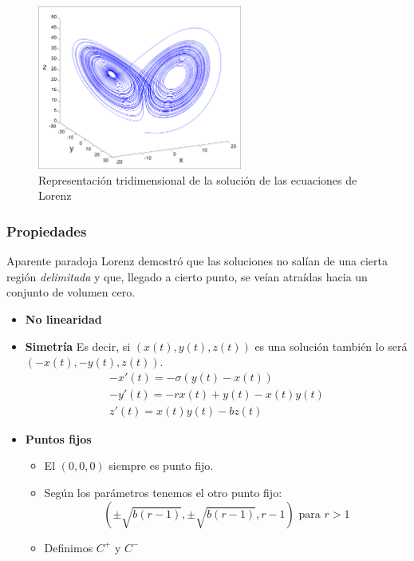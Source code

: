 \documentclass[8pt]{beamer}
\begin{document}
\begin{frame}
\begin{figure}[hbtp]
\centering
\includegraphics[width = 0.6\textwidth]{img/Lorenz.png}
\caption{Representación tridimensional de la solución de las ecuaciones de Lorenz}
\label{fig:Lorenz}
\end{figure}
\end{frame}

\subsubsection{Propiedades}
\begin{frame}
\begin{block}{Aparente paradoja}
Lorenz demostró que las soluciones no salían de una cierta región \emph{delimitada} y que, llegado a cierto punto, se veían atraídas hacia un conjunto de volumen cero.
\end{block}

\begin{itemize}
\item \textbf{No linearidad}
\item \textbf{Simetría}
Es decir, si $(x(t),y(t),z(t))$ es una solución también lo será $(-x(t),-y(t),z(t))$.
\[\begin{array}{l}
-x'(t) = -σ(y(t)-x(t)) \\
-y'(t) = -rx(t)+y(t)-x(t)y(t)\\
z'(t) = x(t)y(t)-bz(t)
\end{array}\]
\item \textbf{Puntos fijos}
\begin{itemize}
\item El $(0,0,0)$ siempre es punto fijo.
\item Según los parámetros tenemos el otro punto fijo:
\[\left(\pm \sqrt{b(r-1)},\pm \sqrt{b(r-1)},r-1\right) \text{ para } r>1\]
\item Definimos $C^+$ y $C^-$
\end{itemize}
\end{itemize}
\end{frame}
\end{document}
